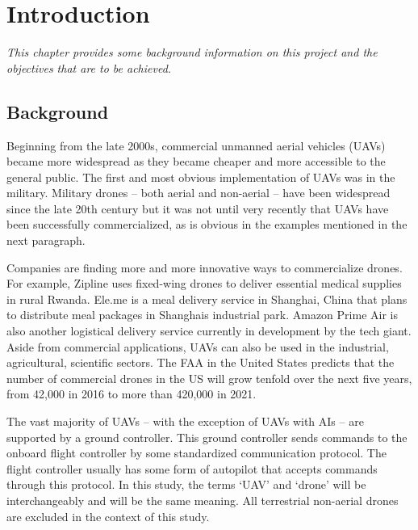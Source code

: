 \setlength{\footskip}{8mm}

\chapter{Introduction}

\textit{This chapter provides some background information on this project and the objectives that are to be achieved.}

\section{Background}
Beginning from the late 2000s, commercial unmanned aerial vehicles (UAVs) became more widespread as they became cheaper and more accessible to the general public. The first and most obvious implementation of UAVs was in the military. Military drones – both aerial and non-aerial – have been widespread since the late 20th century but it was not until very recently that UAVs have been successfully commercialized, as is obvious in the examples mentioned in the next paragraph. 

Companies are finding more and more innovative ways to commercialize drones. For example, Zipline uses fixed-wing drones to deliver essential medical supplies in rural Rwanda. Ele.me is a meal delivery service in Shanghai, China that plans to distribute meal packages in Shanghai\textquotesingle s industrial park. Amazon Prime Air is also another logistical delivery service currently in development by the tech giant. Aside from commercial applications, UAVs can also be used in the industrial, agricultural, scientific sectors. The FAA in the United States predicts that the number of commercial drones in the US will grow tenfold over the next five years, from 42,000 in 2016 to more than 420,000 in 2021\cite{faa}. 

The vast majority of UAVs – with the exception of UAVs with AIs – are supported by a ground controller. This ground controller sends commands to the onboard flight controller by some standardized communication protocol. The flight controller usually has some form of autopilot that accepts commands through this protocol.
In this study, the terms ‘UAV’ and ‘drone’ will be interchangeably and will be the same meaning. All terrestrial non-aerial drones are excluded in the context of this study.



